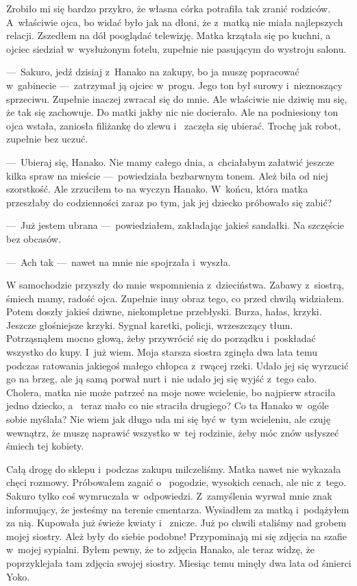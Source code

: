 Zrobiło mi się bardzo przykro, że własna córka potrafiła tak zranić rodziców. A~właściwie ojca, bo widać było jak na 
dłoni, że z~matką nie miała najlepszych relacji. Zszedłem na dół pooglądać telewizję. Matka krzątała się po kuchni, a~
ojciec siedział w~wysłużonym fotelu, zupełnie nie pasującym do wystroju salonu.

---~Sakuro, jedź dzisiaj z~Hanako na zakupy, bo ja muszę popracować w~gabinecie ---~zatrzymał ją ojciec w~progu. Jego 
ton był surowy i~nieznoszący sprzeciwu. Zupełnie inaczej zwracał się do mnie. Ale właściwie nie dziwię mu się, że tak 
się zachowuje. Do matki jakby nic nie docierało. Ale na podniesiony ton ojca wstała, zaniosła filiżankę do zlewu i~
zaczęła się ubierać. Trochę jak robot, zupełnie bez uczuć. 

---~Ubieraj się, Hanako. Nie mamy całego dnia, a~chciałabym załatwić jeszcze kilka spraw na mieście ---~powiedziała 
bezbarwnym tonem. Ależ biła od niej szorstkość. Ale zrzuciłem to na wyczyn Hanako. W~końcu, która matka przeszłaby do 
codzienności zaraz po tym, jak jej dziecko próbowało się zabić? 

---~Już jestem ubrana ---~powiedziałem, zakładając jakieś sandałki. Na szczęście bez obcasów.

---~Ach tak ---~nawet na mnie nie spojrzała i~wyszła.

W samochodzie przyszły do mnie wspomnienia z~dzieciństwa. Zabawy z~siostrą, śmiech mamy, radość ojca. Zupełnie inny 
obraz tego, co przed chwilą widziałem. Potem doszły jakieś dziwne, niekompletne przebłyski. Burza, hałas, krzyki. 
Jeszcze głośniejsze krzyki. Sygnał karetki, policji, wrzeszczący tłum. Potrząsnąłem mocno głową, żeby przywrócić się 
do porządku i~poskładać wszystko do kupy. I~już wiem. Moja starsza siostra zginęła dwa lata temu podczas ratowania 
jakiegoś małego chłopca z~rwącej rzeki. Udało jej się wyrzucić go na brzeg, ale ją samą porwał nurt i~nie udało jej 
się wyjść z~tego cało. Cholera, matka nie może patrzeć na moje nowe wcielenie, bo najpierw straciła jedno dziecko, a~
teraz mało co nie straciła drugiego? Co ta Hanako w~ogóle sobie myślała? Nie wiem jak długo uda mi się być w~tym 
wcieleniu, ale czuję wewnątrz, że muszę naprawić wszystko w~tej rodzinie, żeby móc znów usłyszeć śmiech tej kobiety.

Całą drogę do sklepu i~podczas zakupu milczeliśmy. Matka nawet nie wykazała chęci rozmowy. Próbowałem zagaić o~
pogodzie, wysokich cenach, ale nic z~tego. Sakuro tylko coś wymruczała w~odpowiedzi. Z~zamyślenia wyrwał mnie znak 
informujący, że jesteśmy na terenie cmentarza. Wysiadłem za matką i~podążyłem za nią. Kupowała już świeże kwiaty i~
znicze. Już po chwili staliśmy nad grobem mojej siostry. Ależ były do siebie podobne! Przypominają mi się zdjęcia na 
szafie w~mojej sypialni. Byłem pewny, że to zdjęcia Hanako, ale teraz widzę, że poprzyklejała tam zdjęcia swojej 
siostry. Miesiąc temu minęły dwa lata od śmierci Yoko. 


